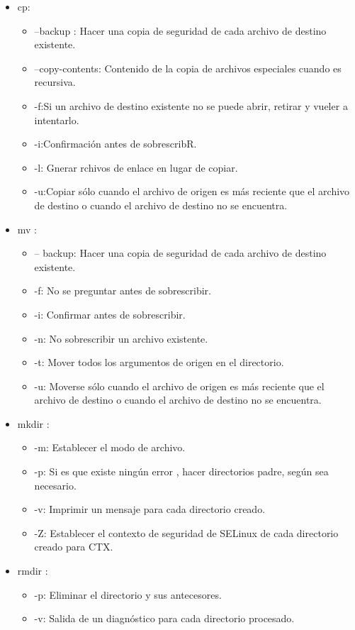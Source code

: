 \documentclass[12pt]{article}
\begin{document}
\begin{itemize}
    \item cp:
    \begin{itemize}
        \item --backup : Hacer una copia de seguridad de cada archivo de destino existente.
        \item --copy-contents: Contenido de la copia de archivos especiales cuando es recursiva.
        \item -f:Si un archivo de destino existente no se puede abrir, retirar y vueler a intentarlo.
        \item -i:Confirmación antes de sobrescribR.
        \item -l: Gnerar rchivos de enlace en lugar de copiar.
        \item -u:Copiar sólo cuando el archivo de origen es más reciente que el archivo de destino o cuando el archivo de destino no se encuentra.
    \end{itemize}
    


    \item mv :
    \begin{itemize}
        \item -- backup: Hacer una copia de seguridad de cada archivo de destino existente.
        \item -f: No se preguntar antes de sobrescribir.
        \item -i: Confirmar antes de sobrescribir.
        \item -n: No sobrescribir un archivo existente.
        \item -t: Mover todos los argumentos de origen en el directorio.
        \item -u: Moverse sólo cuando el archivo de origen es más reciente que el archivo de destino o cuando el archivo de destino no se encuentra.

    \end{itemize}
    
    \item mkdir :
    \begin{itemize}
        \item -m: Establecer el modo de archivo.
        \item -p: Si es que existe ningún error , hacer directorios padre, según sea necesario.
        \item -v: Imprimir un mensaje para cada directorio creado.
        \item -Z: Establecer el contexto de seguridad de SELinux de cada directorio creado para CTX.
    \end{itemize}
    
    \item rmdir :
      \begin{itemize}
        \item -p: Eliminar el directorio y sus antecesores.
        \item -v: Salida de un diagnóstico para cada directorio procesado.
  
    \end{itemize}
    
\end{itemize}
    
\end{document}
